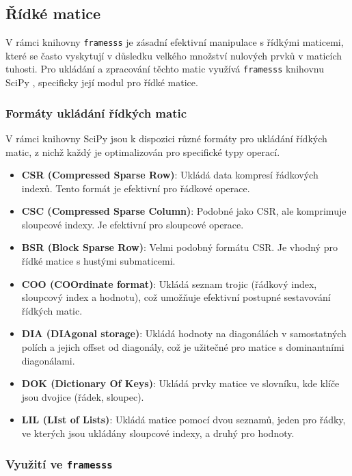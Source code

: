 \subsection{Řídké matice}

V rámci knihovny \texttt{framesss} je zásadní efektivní manipulace s řídkými maticemi, které se často vyskytují v důsledku velkého množství nulových prvků v maticích tuhosti. Pro ukládání a zpracování těchto matic využívá \texttt{framesss} knihovnu SciPy \cite{scipy}, specificky její modul pro řídké matice.

\subsubsection{Formáty ukládání řídkých matic}

V rámci knihovny SciPy jsou k dispozici různé formáty pro ukládání řídkých matic, z nichž každý je optimalizován pro specifické typy operací.

\begin{itemize}
    \item \textbf{CSR (Compressed Sparse Row)}: Ukládá data kompresí řádkových indexů. Tento formát je efektivní pro řádkové operace.
    \item \textbf{CSC (Compressed Sparse Column)}: Podobné jako CSR, ale komprimuje sloupcové indexy. Je efektivní pro sloupcové operace.
    \item \textbf{BSR (Block Sparse Row)}: Velmi podobný formátu CSR. Je vhodný pro řídké matice s hustými submaticemi.
    \item \textbf{COO (COOrdinate format)}: Ukládá seznam trojic (řádkový index, sloupcový index a hodnotu), což umožňuje efektivní postupné sestavování řídkých matic.
    \item \textbf{DIA (DIAgonal storage)}: Ukládá hodnoty na diagonálách v samostatných polích a jejich offset od diagonály, což je užitečné pro matice s dominantními diagonálami.
    \item \textbf{DOK (Dictionary Of Keys)}: Ukládá prvky matice ve slovníku, kde klíče jsou dvojice (řádek, sloupec).
    \item \textbf{LIL (LIst of Lists)}: Ukládá matice pomocí dvou seznamů, jeden pro řádky, ve kterých jsou ukládány sloupcové indexy, a druhý pro hodnoty.
\end{itemize}


\subsubsection{Využití ve \texttt{framesss}}

